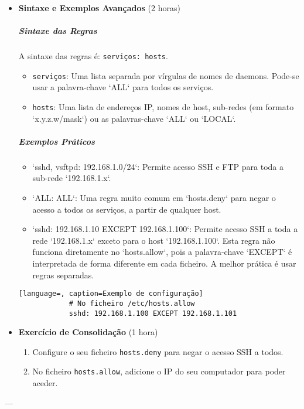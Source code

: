 \documentclass[10pt,a4paper]{article}
\begin{document}
\begin{itemize}
		\item \textbf{Sintaxe e Exemplos Avançados} (2 horas)
		\subparagraph{Sintaxe das Regras} A sintaxe das regras é: \texttt{serviços: hosts}.
		\begin{itemize}
			\item \texttt{serviços}: Uma lista separada por vírgulas de nomes de daemons. Pode-se usar a palavra-chave `ALL` para todos os serviços.
			\item \texttt{hosts}: Uma lista de endereços IP, nomes de host, sub-redes (em formato `x.y.z.w/mask`) ou as palavras-chave `ALL` ou `LOCAL`.
		\end{itemize}
		\subparagraph{Exemplos Práticos}
		\begin{itemize}
			\item `sshd, vsftpd: 192.168.1.0/24`: Permite acesso SSH e FTP para toda a sub-rede `192.168.1.x`.
			\item `ALL: ALL`: Uma regra muito comum em `hosts.deny` para negar o acesso a todos os serviços, a partir de qualquer host.
			\item `sshd: 192.168.1.10 EXCEPT 192.168.1.100`: Permite acesso SSH a toda a rede `192.168.1.x` exceto para o host `192.168.1.100`. Esta regra não funciona diretamente no `hosts.allow`, pois a palavra-chave `EXCEPT` é interpretada de forma diferente em cada ficheiro. A melhor prática é usar regras separadas.
		\end{itemize}
		\begin{lstlisting}[language=, caption=Exemplo de configuração]
			# No ficheiro /etc/hosts.allow
			sshd: 192.168.1.100 EXCEPT 192.168.1.101
		\end{lstlisting}
		
		\item \textbf{Exercício de Consolidação} (1 hora)
		\begin{enumerate}
			\item Configure o seu ficheiro \texttt{hosts.deny} para negar o acesso SSH a todos.
			\item No ficheiro \texttt{hosts.allow}, adicione o IP do seu computador para poder aceder.
		\end{enumerate}
	\end{itemize}
	
	---
	
\end{document}
